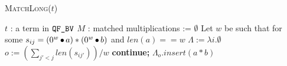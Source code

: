 \begin{algorithm}[t]
 \caption{\textsc{MatchLong}($t$)}
 \label{alg:long}
 \begin{algorithmic}[1]
   \Require $t$ : a term in $\texttt{QF\_BV}$
   \Ensure $M$ : matched multiplications := $\emptyset$
   \State Let $w$ be such that for some $s_{ij} = (0^{w} \mathop{\bullet} a) * (0^{w} \mathop{\bullet} b)$ and  $len(a) == w$ %
   \State $\Lambda := \lambda i. \emptyset$
   \State $o := (\sum_{j' < j} len( s_{ij'}))/w$
    {\bf continue;}
    $\Lambda_o.insert( a * b )$
   \Else~\Return{$\emptyset$}
   \EndIf
   \EndFor
   \State {}
   \EndIf
   \State \Return{$\emptyset$}
 \end{algorithmic}
\end{algorithm}  



